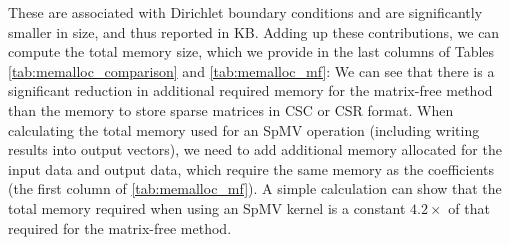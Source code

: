 These are associated with Dirichlet boundary conditions and are significantly smaller in size, and thus reported in KB. Adding up these contributions, we can compute the total memory size, which we provide in the last columns of Tables \autoref{tab:memalloc_comparison} and \autoref{tab:memalloc_mf}: We can see that there is a significant reduction in additional required memory for the matrix-free method than the memory to store sparse matrices in CSC or CSR format. When calculating the total memory used for an SpMV operation (including writing results into output vectors), we need to add additional memory allocated for the input data and output data, which require the same memory as the coefficients (the first column of \autoref{tab:memalloc_mf}). A simple calculation can show that the total memory required when using an SpMV kernel is a constant $4.2\times$ of that required for the matrix-free method. 